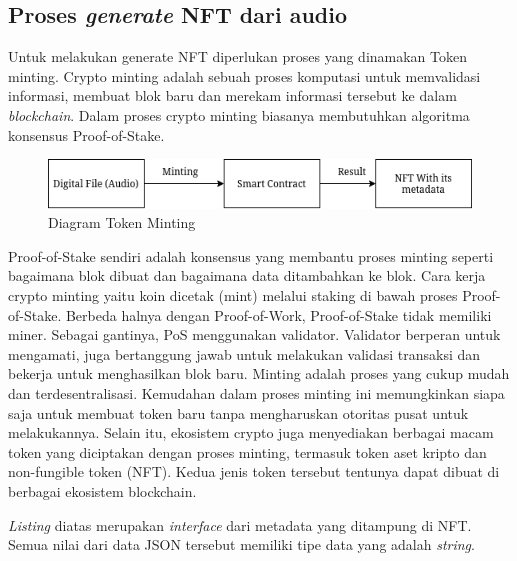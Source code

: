 \subsection{Proses \emph{generate} NFT dari audio}

Untuk melakukan generate NFT diperlukan proses yang dinamakan Token minting.
Crypto minting adalah sebuah proses komputasi untuk memvalidasi informasi, membuat blok baru dan merekam informasi tersebut ke dalam \emph{blockchain}.
Dalam proses crypto minting biasanya membutuhkan algoritma konsensus Proof-of-Stake.

\begin{figure} [ht] \centering
  \includegraphics[scale=0.55]{gambar/mintingtoken.png}
  \caption{Diagram Token Minting}
  \label{fig:mintingtoken}
\end{figure}

Proof-of-Stake sendiri adalah konsensus yang membantu proses minting seperti bagaimana blok dibuat dan bagaimana data ditambahkan ke blok. Cara kerja crypto minting yaitu koin dicetak (mint) melalui staking di bawah proses Proof-of-Stake. Berbeda halnya dengan Proof-of-Work, Proof-of-Stake tidak memiliki miner. Sebagai gantinya, PoS menggunakan validator. Validator berperan untuk mengamati, juga bertanggung jawab untuk melakukan validasi transaksi dan bekerja untuk menghasilkan blok baru.
Minting adalah proses yang cukup mudah dan terdesentralisasi. Kemudahan dalam proses  minting ini memungkinkan siapa saja untuk membuat token baru tanpa mengharuskan otoritas pusat untuk melakukannya.
Selain itu, ekosistem crypto juga menyediakan berbagai macam token yang diciptakan dengan proses minting, termasuk token aset kripto dan non-fungible token (NFT). Kedua jenis token tersebut tentunya dapat dibuat di berbagai ekosistem blockchain.

\emph{Listing} diatas merupakan \emph{interface} dari metadata yang ditampung di NFT. Semua nilai dari data JSON tersebut
memiliki tipe data yang adalah \emph{string}.

